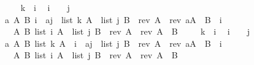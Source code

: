 \documentclass[twoside,runningheads,envcountsame,envcountsect,oribibl,orivec]{llncs}
\begin{document}
\begin{figure}
\begin{isabellebody}
\isanewline\ \ \ {\isasymsqsubseteq}\hfill \isanewline
{\isacharbackquote}k\ {\isacharcolon}{\isacharequal}\ {\isacharat}{\isacharparenleft}{\isacharbackquote}i\ {\isacharplus}\ {}{\isacharparenright}{\isacharsemicolon}\isanewline
{\isacharat}{\isacharparenleft}{\isacharbackquote}i\ {\isacharplus}\ {}{\isacharparenright}\ {\isacharcolon}{\isacharequal}\ {\isacharbackquote}j{\isacharsemicolon}\isanewline
{\isasymlbrakk}{\isacharparenleft}a\ A\ B{\isachardot}\ {\isacharparenleft}{\isacharbackquote}i\ {\isacharbrackleft}{\isasymmapsto}{\isacharbrackright}\ {\isacharbrackleft}a{\isacharcomma}{\isacharbackquote}j{\isacharbrackright}\ {\isacharasterisk}\ list\ {\isacharbackquote}k\ A\ {\isacharasterisk}\ list\ {\isacharbackquote}j\ B{\isacharparenright}\ \ {\isacharparenleft}rev\ A{\isacharparenright}\ {\isacharequal}\ {\isacharparenleft}rev\ {\isacharparenleft}a{\isacharhash}A{\isacharparenright}{\isacharparenright}\ {\isacharat}\ B{\isacharparenright}\ \ {\isacharbackquote}i\ {\isasymnoteq}\ {}{\isacharcomma}\ \isanewline
\ \ A\ B{\isachardot}\ {\isacharparenleft}list\ {\isacharbackquote}i\ A\ {\isacharasterisk}\ list\ {\isacharbackquote}j\ B{\isacharparenright}\ \ {\isacharparenleft}rev\ A{\isacharparenright}\ {\isacharequal}\ {\isacharparenleft}rev\ A{\isacharparenright}\ {\isacharat}\ B\ {\isasymrbrakk}
\isanewline\ \ \ {\isasymsqsubseteq}\hfill \isanewline
{\isacharbackquote}k\ {\isacharcolon}{\isacharequal}\ {\isacharat}{\isacharparenleft}{\isacharbackquote}i\ {\isacharplus}\ {}{\isacharparenright}{\isacharsemicolon}\isanewline
{\isacharat}{\isacharparenleft}{\isacharbackquote}i\ {\isacharplus}\ {}{\isacharparenright}\ {\isacharcolon}{\isacharequal}\ {\isacharbackquote}j{\isacharsemicolon}\isanewline
{\isasymlbrakk}{\isacharparenleft}a\ A\ B{\isachardot}\ {\isacharparenleft}list\ {\isacharbackquote}k\ A\ {\isacharasterisk}\ {\isacharbackquote}i\ {\isacharbrackleft}{\isasymmapsto}{\isacharbrackright}\ {\isacharbrackleft}a{\isacharcomma}{\isacharbackquote}j{\isacharbrackright}\ {\isacharasterisk}\ list\ {\isacharbackquote}j\ B{\isacharparenright}\ \ {\isacharparenleft}rev\ A{\isacharparenright}\ {\isacharequal}\ {\isacharparenleft}rev\ {\isacharparenleft}a{\isacharhash}A{\isacharparenright}{\isacharparenright}\ {\isacharat}\ B{\isacharparenright}\ \ {\isacharbackquote}i\ {\isasymnoteq}\ {}{\isacharcomma}\ \isanewline
\ \ A\ B{\isachardot}\ {\isacharparenleft}list\ {\isacharbackquote}i\ A\ {\isacharasterisk}\ list\ {\isacharbackquote}j\ B{\isacharparenright}\ \ {\isacharparenleft}rev\ A{\isacharparenright}\ {\isacharequal}\ {\isacharparenleft}rev\ A{\isacharparenright}\ {\isacharat}\ B\ {\isasymrbrakk}

\end{isabellebody}
\end{figure}
\end{document}
